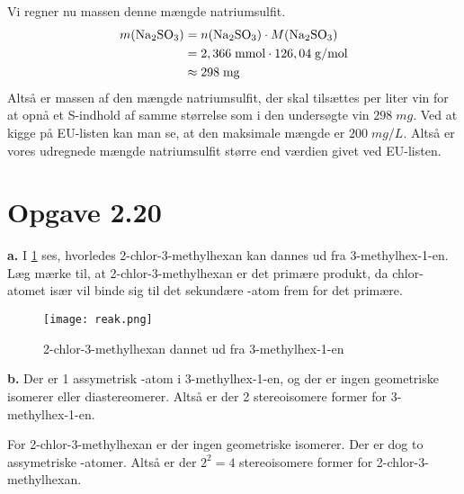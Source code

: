 \documentclass{report}
\begin{document}
Vi regner nu massen denne mængde natriumsulfit.
\begin{equation*}
\begin{split}
  m(\ce{Na2SO3} )&=n(\ce{Na2SO3} ) \cdot M(\ce{Na2SO3} )\\
  &=2,366 \;\unit{mmol} \cdot 126,04 \;\unit{g/mol} \\ 
  &\approx 298 \;\unit{mg} 
\end{split}
\end{equation*}
Altså er massen af den mængde natriumsulfit, der skal tilsættes per liter vin for at opnå et S-indhold af samme størrelse som i den undersøgte vin $298 \;\unit{mg} $.
Ved at kigge på EU-listen kan man se, at den maksimale mængde er $200 \;\unit{mg/L} $.
Altså er vores udregnede mængde natriumsulfit større end værdien givet ved EU-listen.

\section*{Opgave 2.20}
\textbf{a.}
I \cref{fig:reak} ses, hvorledes 2-chlor-3-methylhexan kan dannes ud fra 3-methylhex-1-en.
Læg mærke til, at 2-chlor-3-methylhexan er det primære produkt, da chlor-atomet især vil binde sig til det sekundære -atom frem for det primære.
\begin{figure}[H]
\begin{center}
  \texttt{[image: reak.png]}
\end{center}
\caption{2-chlor-3-methylhexan dannet ud fra 3-methylhex-1-en}
\label{fig:reak}
\end{figure}
\noindent\textbf{b.}
Der er 1 assymetrisk -atom i 3-methylhex-1-en, og der er ingen geometriske isomerer eller diastereomerer.
Altså er der 2 stereoisomere former for 3-methylhex-1-en.

For 2-chlor-3-methylhexan er der ingen geometriske isomerer.
Der er dog to assymetriske -atomer.
Altså er der $2^2=4$ stereoisomere former for 2-chlor-3-methylhexan.
\end{document}
